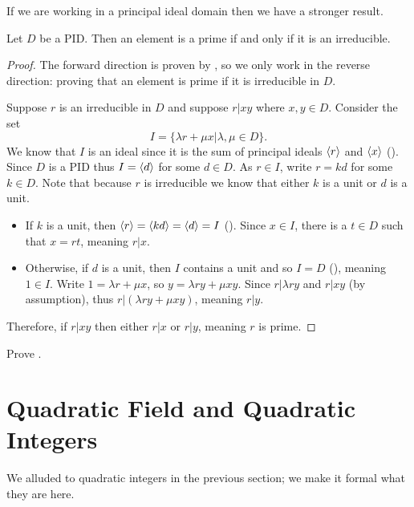 If we are working in a principal ideal domain then we have a stronger result.
\begin{theorem}\label{thrm-in-PID-prime-iff-irreducible}
    Let $D$ be a PID. Then an element is a prime if and only if it is an irreducible.
\end{theorem}
\begin{proof}
    The forward direction is proven by , so we only work in the reverse direction: proving that an element is prime if it is irreducible in $D$.

    Suppose $r$ is an irreducible in $D$ and suppose $r \vert xy$ where $x, y \in D$. Consider the set
    \[
        I = \{\lambda r + \mu x \vert \lambda, \mu \in D\}.
    \]
    We know that $I$ is an ideal since it is the sum of principal ideals $\left\langle r\right\rangle$ and $\left\langle x\right\rangle$ (). Since $D$ is a PID thus $I = \left\langle d\right\rangle$ for some $d \in D$. As $r \in I$, write $r = kd$ for some $k \in D$. Note that because $r$ is irreducible we know that either $k$ is a unit or $d$ is a unit.
    \begin{itemize}
        \item If $k$ is a unit, then $\left\langle r\right\rangle = \left\langle kd\right\rangle = \left\langle d\right\rangle = I$ (). Since $x \in I$, there is a $t \in D$ such that $x = rt$, meaning $r \vert x$.
        \item Otherwise, if $d$ is a unit, then $I$ contains a unit and so $I = D$ (), meaning $1 \in I$. Write $1 = \lambda r + \mu x$, so $y = \lambda ry + \mu xy$. Since $r \vert \lambda ry$ and $r \vert xy$ (by assumption), thus $r \vert (\lambda ry + \mu xy)$, meaning $r \vert y$.
    \end{itemize}
    Therefore, if $r \vert xy$ then either $r \vert x$ or $r \vert y$, meaning $r$ is prime.
\end{proof}
\begin{exercise}\label{exercise-associates-of-irreducible-is-irreducible}
    Prove .
\end{exercise}

\section{Quadratic Field and Quadratic Integers}
We alluded to quadratic integers in the previous section; we make it formal what they are here.

